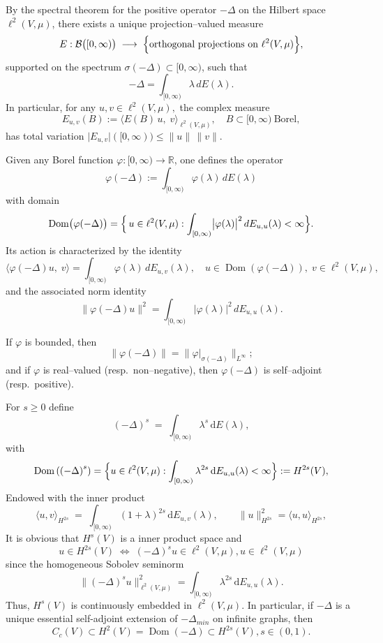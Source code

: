 \documentclass[reqno,12pt]{amsart}
\numberwithin{equation}{section}
\begin{document}
By the spectral theorem for the positive operator \(-\Delta\) on the Hilbert space \(\ell^{2}(V,\mu)\), there exists a unique projection–valued measure
\[
E:\mathcal B\bigl([0,\infty)\bigr)\;\longrightarrow\;
\Bigl\{\text{orthogonal projections on }\ell^{2}(V,\mu)\Bigr\},
\]
supported on the spectrum \(\sigma(-\Delta)\subset[0,\infty)\), such that
\[
-\Delta
=
\int_{[0,\infty)}\lambda\,dE(\lambda).
\]
In particular, for any \(u,v\in\ell^{2}(V,\mu),\) the complex measure
\[
E_{u,v}(B)
:=\langle E(B)\,u,\;v\rangle_{\ell^{2}(V,\mu)},
\quad B\subset[0,\infty)\ \text{Borel},
\]
has total variation
\(\lvert E_{u,v}\rvert([0,\infty))\le\|u\|\,\|v\|\).

Given any Borel function \(\varphi:[0,\infty)\to\mathbb{R}\), one defines the operator
\[
\varphi(-\Delta)
:=\int_{[0,\infty)}\varphi(\lambda)\,dE(\lambda)
\]
with domain
\[
\operatorname{Dom}\bigl(\varphi(-\Delta)\bigr)
=\Bigl\{\,u\in\ell^{2}(V,\mu):\int_{[0,\infty)}\bigl|\varphi(\lambda)\bigr|^2
\,dE_{u,u}(\lambda)<\infty\Bigr\}.
\]
Its action is characterized by the identity
\[
\langle \varphi(-\Delta)u,\;v\rangle
=\int_{[0,\infty)}\varphi(\lambda)\,dE_{u,v}(\lambda),
\quad u\in\operatorname{Dom}(\varphi(-\Delta)),\;v\in\ell^{2}(V,\mu),
\]
and the associated norm identity
\[
\bigl\|\varphi(-\Delta)u\bigr\|^2
=\int_{[0,\infty)}\bigl|\varphi(\lambda)\bigr|^2\,dE_{u,u}(\lambda).
\]

If $\varphi$ is bounded, then $$\|\varphi(-\Delta)\|=\|\varphi\big|_{\sigma\left(-\Delta\right)}\|_{L^{\infty}};$$
and if $\varphi$ is real–valued (resp.\ non–negative), 
then $\varphi(-\Delta)$ is self–adjoint (resp.\ positive).

For $s\ge 0$ define
\[
(-\Delta)^{s}
\;=\;
\int_{[0,\infty)}\lambda^{s}\,\mathrm dE(\lambda),
\]
with 
\[\operatorname{Dom}\left(\left(-\Delta\right)^s\right)=\Bigl\{u\in\ell^{2}(V,\mu):
\int_{[0,\infty)}\lambda^{2s}\,\mathrm dE_{u,u}(\lambda)<\infty
\Bigr\}:=H^{2s}(V),\]
Endowed with the inner product
\[
\langle u,v\rangle_{H^{2s}}
\;=\;
\int_{[0,\infty)}(1+\lambda)^{2s}\,\mathrm dE_{u,v}(\lambda),
\qquad
\|u\|_{H^{2s}}^2
=\langle u,u\rangle_{H^{2s}},\] 
It is obvious that \(H^{s}(V)\) is a inner product  space and
\[
u\in H^{2s}(V)
\;\Longleftrightarrow\;
(-\Delta)^{s}u\in\ell^{2}(V,\mu), u\in \ell^{2}(V,\mu)
\]
since the homogeneous Sobolev seminorm
\[
\|(-\Delta)^{s}u\|_{\ell^{2}\left(V,\mu\right)}^{2}
=
\int_{[0,\infty)}\lambda^{2s}\,\mathrm dE_{u,u}(\lambda).
\]
Thus, $H^{s}\left(V\right)$ is continuously embedded in $\ell^{2}\left(V,\mu\right).$ In particular, if $-\Delta$ is a unique essential self-adjoint extension of $-\Delta_{min}$ on infinite graphs, then  $$C_c\left(V\right)\subset H^{2}\left(V\right)=\operatorname{Dom}\left(-\Delta\right)\subset H^{2s}\left(V\right),s\in \left(0,1\right).$$ 
\end{document}
